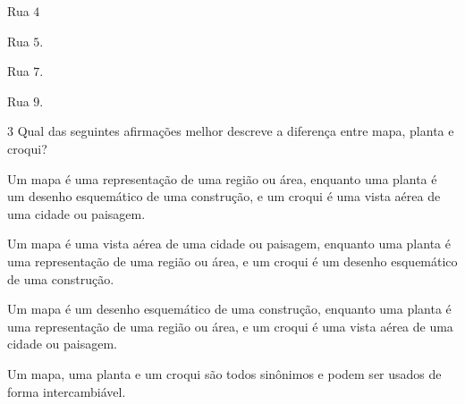 \begin{multicols}{2}
\begin{escolha}
\item Rua $4$
\item Rua $5$.
\item Rua $7$.
\item Rua $9$.
\end{escolha}
\end{multicols}



\num{3}  Qual das seguintes afirmações melhor descreve a diferença entre mapa,
planta e croqui?

\begin{escolha}
\item
  Um mapa é uma representação de uma região ou área, enquanto uma planta
  é um desenho esquemático de uma construção, e um croqui é uma vista
  aérea de uma cidade ou paisagem.
\item
  Um mapa é uma vista aérea de uma cidade ou paisagem, enquanto uma
  planta é uma representação de uma região ou área, e um croqui é um
  desenho esquemático de uma construção.
\item
  Um mapa é um desenho esquemático de uma construção, enquanto uma
  planta é uma representação de uma região ou área, e um croqui é uma
  vista aérea de uma cidade ou paisagem.
\item
  Um mapa, uma planta e um croqui são todos sinônimos e podem ser usados
  de forma intercambiável.
\end{escolha}


